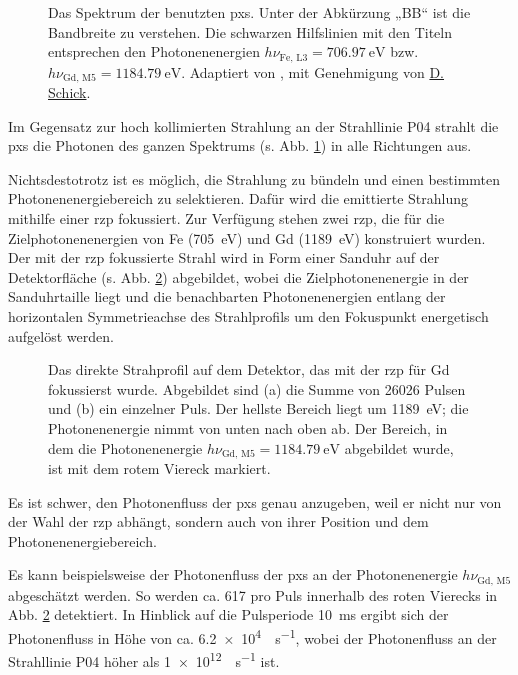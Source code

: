 \begin{figure}[H]
    \centering
    
    \caption{Das Spektrum der benutzten \gls{pxs}. Unter der Abkürzung „BB“ ist die Bandbreite zu verstehen. Die schwarzen Hilfslinien mit den Titeln entsprechen den Photonenenergien $h\nu_{\text{Fe, L3}} = \SI{706.97}{\eV}$ bzw. $h\nu_{\text{Gd, M5}} = \SI{1184,79}{\eV}$. Adaptiert von \cite{schick_laser-driven_2021}, mit Genehmigung von \href{https://orcid.org/0000-0001-7988-6489}{D. Schick}.}
    \label{fig:pxs_spectrum}
\end{figure}
\noindent
Im Gegensatz zur hoch kollimierten Strahlung an der Strahllinie P04 strahlt die \gls{pxs} die Photonen des ganzen Spektrums (s. Abb. \ref{fig:pxs_spectrum}) in alle Richtungen aus.

\noindent
Nichtsdestotrotz ist es möglich, die Strahlung zu bündeln und einen bestimmten Photonenenergiebereich zu selektieren. Dafür wird die emittierte Strahlung mithilfe einer \gls{rzp} fokussiert. Zur Verfügung stehen zwei \gls{rzp}, die für die Zielphotonenenergien von Fe (\SI{705}{\eV}) und Gd (\SI{1189}{\eV}) konstruiert wurden. Der mit der \gls{rzp} fokussierte Strahl wird in Form einer Sanduhr auf der Detektorfläche (s. Abb. \ref{fig:butterfly_moench}) abgebildet, wobei die Zielphotonenenergie in der Sanduhrtaille liegt und die benachbarten Photonenenergien entlang der horizontalen Symmetrieachse des Strahlprofils um den Fokuspunkt energetisch aufgelöst werden.
\begin{figure}[H]
    \centering
    
    \label{fig:butterfly_moench_sum}
    \caption{Das direkte Strahprofil auf dem Detektor, das mit der \gls{rzp} für Gd fokussierst wurde. Abgebildet sind (a) die Summe von 26026 Pulsen und (b) ein einzelner Puls. Der hellste Bereich liegt um \SI{1189}{\eV}; die Photonenenergie nimmt von unten nach oben ab. Der Bereich, in dem die Photonenenergie $h\nu_{\text{Gd, M5}} = \SI{1184,79}{\eV}$ abgebildet wurde, ist mit dem rotem Viereck markiert.}
    \label{fig:butterfly_moench}
\end{figure}
\noindent
Es ist schwer, den Photonenfluss der \gls{pxs} genau anzugeben, weil er nicht nur von der Wahl der \gls{rzp} abhängt, sondern auch von ihrer Position und dem  Photonenenergiebereich.

\noindent
Es kann beispielsweise der Photonenfluss der \gls{pxs} an der Photonenenergie $h\nu_\text{Gd, M5}$ abgeschätzt werden. So werden ca. \SI{617}{\photons} pro Puls innerhalb des roten Vierecks in Abb. \ref{fig:butterfly_moench} detektiert. In Hinblick auf die Pulsperiode \SI{10}{\milli\second} ergibt sich der Photonenfluss in Höhe von ca. \SI[per-mode = symbol]{6.2e4}{\photons\per\second}, wobei der Photonenfluss an der Strahllinie P04 höher als \SI[per-mode = symbol]{1e12}{\photons\per\second} ist.

